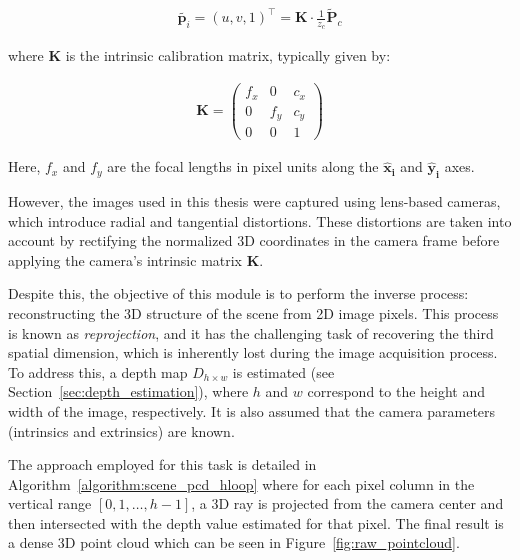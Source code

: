 \begin{align}
    \tilde{\mathbf{p}_i}
    = \left(u, v, 1\right)^\top
    = \mathbf{K} \cdot \frac{1}{z_c} \tilde{\mathbf{P}}_c
\end{align}

where $\mathbf{K}$ is the intrinsic calibration matrix, typically given by:

\begin{align}
    \mathbf{K} =
    \begin{pmatrix}
        f_x & 0 & c_x \\
        0 & f_y & c_y \\
        0 & 0 & 1
    \end{pmatrix}
\end{align}

Here, $f_x$ and $f_y$ are the focal lengths in pixel units along the $\mathbf{\hat{x}_i}$ and $\mathbf{\hat{y}_i}$ axes.

However, the images used in this thesis were captured using lens-based cameras, which introduce radial and tangential distortions. These distortions are taken into account by rectifying the normalized 3D coordinates in the camera frame before applying the camera's intrinsic matrix $\mathbf{K}$.

Despite this, the objective of this module is to perform the inverse process: reconstructing the 3D structure of the scene from 2D image pixels. This process is known as \textit{reprojection}, and it has the challenging task of recovering the third spatial dimension, which is inherently lost during the image acquisition process. To address this, a depth map $D_{h \times w}$ is estimated (see Section~\ref{sec:depth_estimation}), where $h$ and $w$ correspond to the height and width of the image, respectively. It is also assumed that the camera parameters (intrinsics and extrinsics) are known.

The approach employed for this task is detailed in Algorithm~\ref{algorithm:scene_pcd_hloop} where for each pixel column in the vertical range $\left[0, 1, \dots, h{-}1 \right]$, a 3D ray is projected from the camera center and then intersected with the depth value estimated for that pixel. The final result is a dense 3D point cloud which can be seen in Figure~\ref{fig:raw_pointcloud}.

